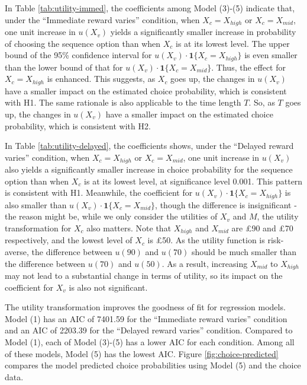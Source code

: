 \documentclass[
  12pt,
]{article}
\begin{document}
\begin{landscape}

\end{landscape}

\begin{landscape}

\end{landscape}

In Table \ref{tab:utility-immed}, the coefficients among Model (3)-(5)
indicate that, under the ``Immediate reward varies'' condition, when
\(X_c=X_{high}\) or \(X_c=X_{mid}\), one unit increase in \(u(X_v)\)
yields a significantly smaller increase in probability of choosing the
sequence option than when \(X_c\) is at its lowest level. The upper
bound of the 95\% confidence interval for
\(u(X_v)\cdot\textbf{1}\{X_c=X_{high}\}\) is even smaller than the lower
bound of that for \(u(X_v)\cdot\textbf{1}\{X_c=X_{mid}\}\). Thus, the
effect for \(X_c=X_{high}\) is enhanced. This suggests, as \(X_c\) goes
up, the changes in \(u(X_v)\) have a smaller impact on the estimated
choice probability, which is consistent with H1. The same rationale is
also applicable to the time length \(T\). So, as \(T\) goes up, the
changes in \(u(X_v)\) have a smaller impact on the estimated choice
probability, which is consistent with H2.

In Table \ref{tab:utility-delayed}, the coefficients shows, under the
``Delayed reward varies'' condition, when \(X_c=X_{high}\) or
\(X_c=X_{mid}\), one unit increase in \(u(X_v)\) also yields a
significantly smaller increase in choice probability for the sequence
option than when \(X_c\) is at its lowest level, at significance level
0.001. This pattern is consistent with H1. Meanwhile, the coefficient
for \(u(X_v)\cdot\textbf{1}\{X_c=X_{high}\}\) is also smaller than
\(u(X_v)\cdot\textbf{1}\{X_c=X_{mid}\}\), though the difference is
insignificant - the reason might be, while we only consider the
utilities of \(X_v\) and \(M\), the utility transformation for \(X_c\)
also matters. Note that \(X_{high}\) and \(X_{mid}\) are £90 and £70
respectively, and the lowest level of \(X_c\) is £50. As the utility
function is risk-averse, the difference between \(u(90)\) and \(u(70)\)
should be much smaller than the difference between \(u(70)\) and
\(u(50)\). As a result, increasing \(X_{mid}\) to \(X_{high}\) may not
lead to a substantial change in terms of utility, so its impact on the
coefficient for \(X_v\) is also not significant.

The utility transformation improves the goodness of fit for regression
models. Model (1) has an AIC of 7401.59 for the ``Immediate reward
varies'' condition and an AIC of 2203.39 for the ``Delayed reward
varies'' condition. Compared to Model (1), each of Model (3)-(5) has a
lower AIC for each condition. Among all of these models, Model (5) has
the lowest AIC. Figure \ref{fig:choice-predicted} compares the model
predicted choice probabilities using Model (5) and the choice data.
\end{document}
